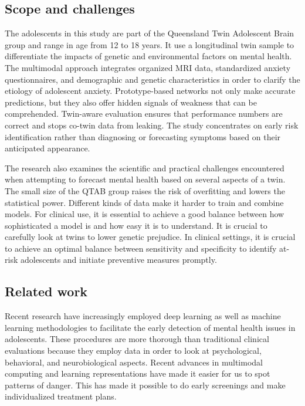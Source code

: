 \documentclass[10pt,letterpaper]{article}
\begin{document}
\subsection*{Scope and challenges}
        The adolescents in this study are part of the Queensland Twin Adolescent Brain group and range in age from 12 to 18 years. It use a longitudinal twin sample to differentiate the impacts of genetic and environmental factors on mental health. The multimodal approach integrates organized MRI data, standardized anxiety questionnaires, and demographic and genetic characteristics in order to clarify the etiology of adolescent anxiety. Prototype-based networks not only make accurate predictions, but they also offer hidden signals of weakness that can be comprehended. Twin-aware evaluation ensures that performance numbers are correct and stops co-twin data from leaking. The study concentrates on early risk identification rather than diagnosing or forecasting symptoms based on their anticipated appearance.

        The research also examines the scientific and practical challenges encountered when attempting to forecast mental health based on several aspects of a twin. The small size of the QTAB group raises the risk of overfitting and lowers the statistical power. Different kinds of data make it harder to train and combine models. For clinical use, it is essential to achieve a good balance between how sophisticated a model is and how easy it is to understand. It is crucial to carefully look at twins to lower genetic prejudice. In clinical settings, it is crucial to achieve an optimal balance between sensitivity and specificity to identify at-risk adolescents and initiate preventive measures promptly.

        \subsection*{Related work}

        Recent research have increasingly employed deep learning as well as machine learning methodologies to facilitate the early detection of mental health issues in adolescents. These procedures are more thorough than traditional clinical evaluations because they employ data in order to look at psychological, behavioral, and neurobiological aspects. Recent advances in multimodal computing and learning representations have made it easier for us to spot patterns of danger. This has made it possible to do early screenings and make individualized treatment plans.
\end{document}
